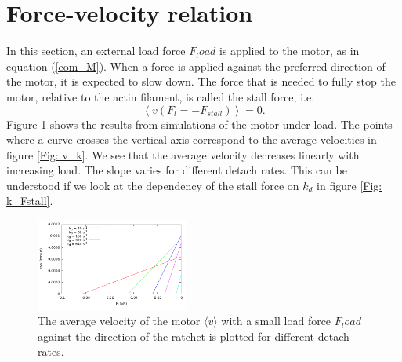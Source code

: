 \documentclass[aps,pre,twocolumn,showpacs,showkeys,a4paper]{revtex4}
\begin{document}
\section{Force-velocity relation}
In this section, an external load force $F_load$ is applied to the motor, as in equation (\ref{eom_M}). 
When a force is applied against the preferred direction of the motor, it is expected to slow down. 
The force that is needed to fully stop the motor, relative to the actin filament, is called the stall force, i.e. 
\[
\left\langle v ( F_{l} = -F_{stall} ) \right\rangle = 0 .
\]
Figure \ref{Fig: F_v_zoom}  shows the results from simulations of the motor under load. 
The points where a curve crosses the vertical axis correspond to the average velocities in figure \ref{Fig: v_k}. 
We see that the average velocity decreases linearly with increasing load. 
The slope varies for different detach rates. This can be understood if we look at the dependency of the stall force on $k_{d}$ in figure \ref{Fig: k_Fstall}.
\begin{figure}[b]
\centering
\includegraphics[width=0.45\textwidth,height=!]{F_v_zoom}
\caption{The average velocity of the motor $\langle v \rangle$ with a small load force $F_load$ against the direction of the ratchet is plotted for different detach rates.}
\label{Fig: F_v_zoom} 
\end{figure}
\end{document}
